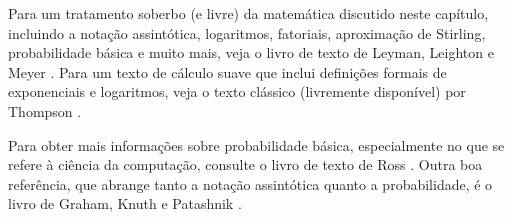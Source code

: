 	Para um tratamento soberbo (e livre) da matemática discutido neste capítulo, incluindo 
	a notação assintótica, logaritmos, fatoriais, aproximação de Stirling, probabilidade 
	básica e muito mais, veja o livro de texto de Leyman, Leighton e Meyer \cite{llm11}. 
	Para um texto de cálculo suave que inclui definições formais de exponenciais e 
	logaritmos, veja o texto clássico (livremente disponível) por Thompson \cite{t14}.
	
	Para obter mais informações sobre probabilidade básica, especialmente no que se refere à 
	ciência da computação, consulte o livro de texto de Ross \cite{r01}. Outra boa 
	referência, que abrange tanto a notação assintótica quanto a probabilidade, é o 
	livro de Graham, Knuth e Patashnik \cite{gkp94}.
	
	
